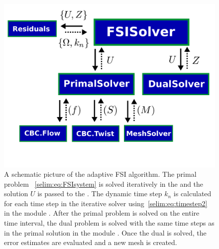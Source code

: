 \begin{figure}
  \centering
  \includegraphics[width=\largefig]{chapters/selim/pdf/adaptive.pdf}
  \caption{A schematic picture of the adaptive FSI algorithm. The primal
    problem ~\eqref{selim:eq:FSIsystem} is solved iteratively in the
     and the solution $U$ is passed to the
    . The dynamic time step $k_n$ is calculated for
    each time step in the iterative solver 
    using~\eqref{selim:eq:timestep2} in the module
    . After the primal problem is solved on the entire
    time interval, the dual problem is solved with the same time steps
    as in the primal solution in the module . Once
    the dual is solved, the error estimates are evaluated and a new mesh
    is created.}
  \label{selim:fig:adaptiveMAP}
\end{figure}

